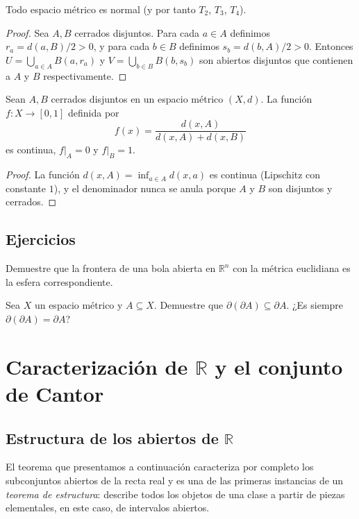 \begin{theorem}
\label{teo:metrico-normal}
Todo espacio métrico es normal (y por tanto $T_2$, $T_3$, $T_4$).
\end{theorem}
\begin{proof}
Sea $A,B$ cerrados disjuntos. Para cada $a\in A$ definimos $r_a=d(a,B)/2>0$, y para cada $b\in B$ definimos $s_b=d(b,A)/2>0$. Entonces $U=\bigcup_{a\in A}B(a,r_a)$ y $V=\bigcup_{b\in B}B(b,s_b)$ son abiertos disjuntos que contienen a $A$ y $B$ respectivamente.
\end{proof}

\begin{corollary}
\label{cor:urysohn-metrico}
Sean $A,B$ cerrados disjuntos en un espacio métrico $(X,d)$. La función $f\colon X\to[0,1]$ definida por
\[
  f(x)=\frac{d(x,A)}{d(x,A)+d(x,B)}
\]
es continua, $f|_A=0$ y $f|_B=1$.
\end{corollary}
\begin{proof}
La función $d(x,A)=\inf_{a\in A}d(x,a)$ es continua (Lipschitz con constante $1$), y el denominador nunca se anula porque $A$ y $B$ son disjuntos y cerrados.
\end{proof}

\subsection{Ejercicios}

\begin{exercise}
Demuestre que la frontera de una bola abierta en $\mathbb{R}^n$ con la métrica euclidiana es la esfera correspondiente.
\end{exercise}

\begin{problem}
Sea $X$ un espacio métrico y $A\subseteq X$. Demuestre que $\partial(\partial A)\subseteq\partial A$. ¿Es siempre $\partial(\partial A)=\partial A$?
\end{problem}

\section{Caracterización de $\mathbb{R}$ y el conjunto de Cantor}

\subsection{Estructura de los abiertos de $\mathbb{R}$}

El teorema que presentamos a continuación caracteriza por completo los subconjuntos abiertos de la recta real y es una de las primeras instancias de un \emph{teorema de estructura}: describe todos los objetos de una clase a partir de piezas elementales, en este caso, de intervalos abiertos.

